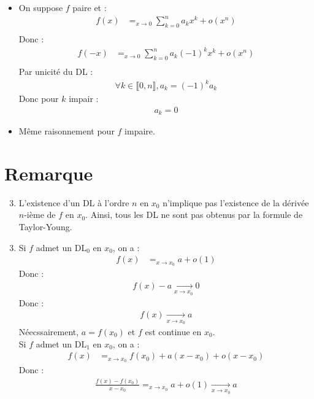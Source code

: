 \documentclass[../main.tex]{subfiles}
\begin{document}
\begin{itemize}
    \item On suppose $f$ paire et : 
    \begin{align*}
        f(x) &=_{x\to 0} \sum_{k=0}^{n} a_k x^k + o(x^n) \\
    \end{align*}
    Donc : 
    \begin{align*}
        f(-x) &=_{x\to 0} \sum_{k=0}^{n} a_k (-1)^kx^k + o(x^n) \\
    \end{align*}
    Par unicité du DL : 
    \begin{align*}
        \forall k \in \llbracket 0, n \rrbracket, a_k = (-1)^k a_k
    \end{align*}
    Donc pour $k$ impair : 
    \begin{align*}
        a_k = 0
    \end{align*}
    \item Même raisonnement pour $f$ impaire.
\end{itemize}

\section{Remarque}
\begin{tcolorbox}[title=Remarque 25.42, title filled=false, colframe=lightblue, colback=lightblue!10!white]
    \begin{enumerate}
        \setcounter{enumi}{2}
        \item L'existence d'un DL à l'ordre $n$ en $x_0$ n'implique pas l'existence de la dérivée $n$-ième de $f$ en $x_0$. Ainsi, tous les DL ne sont pas obtenus par la formule de Taylor-Young. 
    \end{enumerate}
\end{tcolorbox}

\begin{enumerate}
    \setcounter{enumi}{2}
    \item Si $f$ admet un $\text{DL}_0$ en $x_0$, on a : 
    \begin{align*}
        f(x) &=_{x\to x_0} a + o(1)
    \end{align*}
    Donc : 
    \begin{align*}
        f(x) - a \underset{x \to x_0}{\longrightarrow} 0
    \end{align*}
    Donc : 
    \begin{align*}
        f(x) \underset{x \to x_0}{\longrightarrow} a
    \end{align*}
    Néecssairement, $a = f(x_0)$ et $f$ est continue en $x_0$. \\
    Si $f$ admet un $\text{DL}_1$ en $x_0$, on a : 
    \begin{align*}
        f(x) &=_{x\to x_0} f(x_0) + a (x - x_0) + o(x - x_0)
    \end{align*}
    Donc : 
    \begin{align*}
        \frac{f(x) - f(x_0)}{x - x_0} =_{x\to x_0} a + o(1) \underset{x \to x_0}{\longrightarrow} a
    \end{align*}
\end{enumerate}
\end{document}
